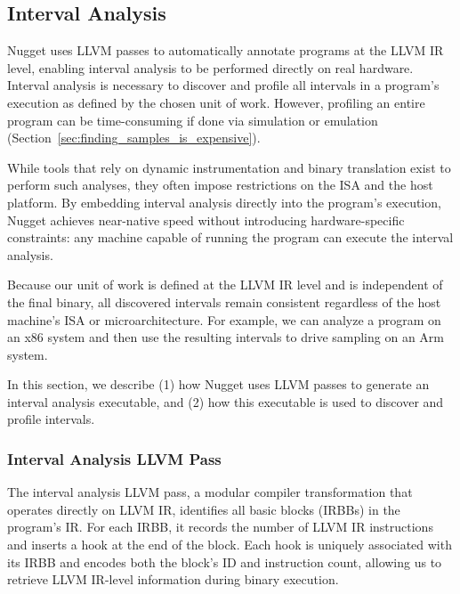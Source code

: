 \subsection{Interval Analysis}\label{sec:interval_analysis}

Nugget uses LLVM passes to automatically annotate programs at the LLVM IR level, enabling interval analysis to be performed directly on real hardware.
Interval analysis is necessary to discover and profile all intervals in a program's execution as defined by the chosen unit of work.
However, profiling an entire program can be time-consuming if done via simulation or emulation (Section~\ref{sec:finding_samples_is_expensive}).

While tools that rely on dynamic instrumentation and binary translation exist to perform such analyses, they often impose restrictions on the ISA and the host platform.
By embedding interval analysis directly into the program's execution, Nugget achieves near-native speed without introducing hardware-specific constraints: any machine capable of running the program can execute the interval analysis.

Because our unit of work is defined at the LLVM IR level and is independent of the final binary, all discovered intervals remain consistent regardless of the host machine's ISA or microarchitecture.
For example, we can analyze a program on an x86 system and then use the resulting intervals to drive sampling on an Arm system.

In this section, we describe (1) how Nugget uses LLVM passes to generate an interval analysis executable, and (2) how this executable is used to discover and profile intervals.

\subsubsection{Interval Analysis LLVM Pass}\label{sec:interval_analysis_llvm_pass}


The interval analysis LLVM pass, a modular compiler transformation that operates directly on LLVM IR, identifies all basic blocks (IRBBs) in the program's IR.
For each IRBB, it records the number of LLVM IR instructions and inserts a hook at the end of the block.
Each hook is uniquely associated with its IRBB and encodes both the block's ID and instruction count, allowing us to retrieve LLVM IR-level information during binary execution.


